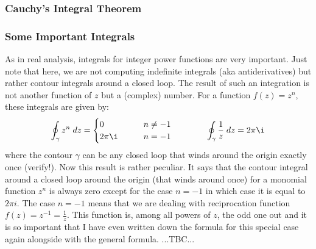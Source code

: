 


\subsubsection{Cauchy's Integral Theorem}




\subsubsection{Some Important Integrals}
As in real analysis, integrals for integer power functions are very important. Just note that here, we are not computing indefinite integrals (aka antiderivatives) but rather contour integrals around a closed loop. The result of such an integration is not another function of $z$ but a (complex) number. For a function $f(z) = z^n$, these integrals are given by:
\begin{equation}
\oint_{\gamma} z^n \; dz = 
\begin{cases}
0        \qquad & n \neq -1 \\
2 \pi \i \qquad & n = -1
\end{cases}
\qquad \qquad
\oint_{\gamma} \frac{1}{z} \; dz = 2 \pi \i
\end{equation}
where the contour $\gamma$ can be any closed loop that winds around the origin exactly once (verify!). Now this result is rather peculiar. It says that the contour integral around a closed loop around the origin (that winds around once) for a monomial function $z^n$ is always zero except for the case $n=-1$ in which case it is equal to $2 \pi i$. The case $n=-1$ means that we are dealing with reciprocation function $f(z) = z^{-1} = \frac{1}{z}$. This function is, among all powers of $z$, the odd one out and it is so important that I have even written down the formula for this special case again alongside with the general formula. ...TBC...




